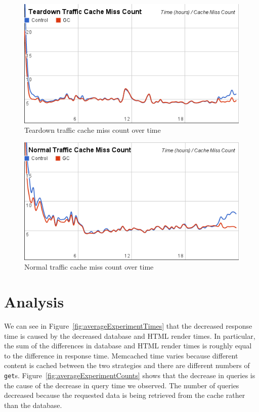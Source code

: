 \documentclass[12pt]{ucthesis}
\begin{document}
\begin{figure}[htp]
\centering
\includegraphics[width=\textwidth]{assets/teardownMissCountXTime.png}
\caption{Teardown traffic cache miss count over time}
\label{fig:teardownMissCountXTime}
\end{figure}

\begin{figure}[htp]
\centering
\includegraphics[width=\textwidth]{assets/normalMissCountXTime.png}
\caption{Normal traffic cache miss count over time}
\label{fig:normalMissCountXTime}
\end{figure}

\section{Analysis}
We can see in Figure~\ref{fig:averageExperimentTimes} that the decreased response time is caused by the decreased database and HTML render times.
In particular, the sum of the differences in database and HTML render times is roughly equal to the difference in response time.
\textsf{Memcached} time varies because different content is cached between the two strategies and there are different numbers of {\tt get}s.
Figure~\ref{fig:averageExperimentCounts} shows that the decrease in queries is the cause of the decrease in query time we observed.
The number of queries decreased because the requested data is being retrieved from the cache rather than the database.
\end{document}
